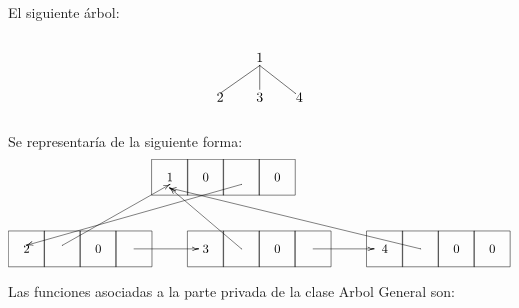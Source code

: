 \documentclass[10pt,a4paper,spanish]{report}
\begin{document}
\noindent
El siguiente árbol:

\[\begin{xy}
,(0,0)*+=<10mm>[]\txt<2cm>{1}
,(-10,-10)*+=<10mm>[]\txt<2cm>{2}
,(0,-10)*+=<10mm>[]\txt<2cm>{3}
,(10,-10)*+=<10mm>[]\txt<2cm>{4}

\ar@{-} (0,-2);(-10,-9) %
\ar@{-} (0,-2);(0,-8) %
\ar@{-} (0,-2);(9,-9) %
\end{xy}\]

\noindent
Se representaría de la siguiente forma:
\[\begin{xy}
,(0,0)*+=<10mm>[F]\txt<1cm>{1}
,(10,0)*+=<10mm>[F]\txt<1cm>{0}
,(20,0)*+=<10mm>[F]\txt<1cm>{ }
,(30,0)*+=<10mm>[F]\txt<1cm>{0}
,(-40,-20)*+=<10mm>[F]\txt<1cm>{2}
,(-30,-20)*+=<10mm>[F]\txt<1cm>{ }
,(-20,-20)*+=<10mm>[F]\txt<1cm>{0}
,(-10,-20)*+=<10mm>[F]\txt<1cm>{ }
,(10,-20)*+=<10mm>[F]\txt<1cm>{3}
,(20,-20)*+=<10mm>[F]\txt<1cm>{ }
,(30,-20)*+=<10mm>[F]\txt<1cm>{0}
,(40,-20)*+=<10mm>[F]\txt<1cm>{ }
,(60,-20)*+=<10mm>[F]\txt<1cm>{4}
,(70,-20)*+=<10mm>[F]\txt<1cm>{ }
,(80,-20)*+=<10mm>[F]\txt<1cm>{0}
,(90,-20)*+=<10mm>[F]\txt<1cm>{0}

\ar@{->} (20,-2);(-40,-19) %
\ar@{->} (-30,-19);(0,-2) %
\ar@{->} (-10,-20);(8,-20) %
\ar@{->} (20,-20);(0,-3) %
\ar@{->} (40,-20);(57,-20) %
\ar@{->} (70,-20);(0,-3) %
\end{xy}\]

\noindent
Las funciones asociadas a la parte privada de la clase Arbol General son:
\end{document}
